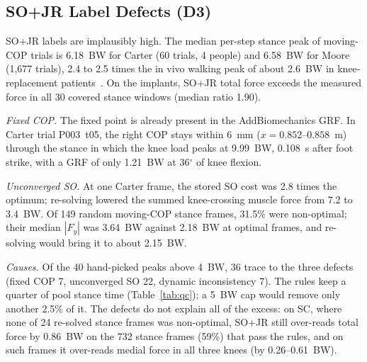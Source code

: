 \subsection{SO+JR Label Defects (D3)}\label{sec:res-d3}
SO+JR labels are implausibly high. The median per-step stance peak of moving-COP trials is
6.18~BW for Carter (60 trials, 4 people) and 6.58~BW for Moore (1,677 trials), 2.4 to 2.5 times
the in vivo walking peak of about 2.6~BW in knee-replacement patients~\cite{kutzner2010}. On the
implants, SO+JR total force exceeds the measured force in all 30 covered stance windows (median
ratio 1.90).

\textit{Fixed COP.} The fixed point is already present in the AddBiomechanics GRF. In Carter trial
P003~t05, the right COP stays within 6~mm ($x = 0.852$--$0.858$~m) through the stance in which the
knee load peaks at 9.99~BW, 0.108~s after foot strike, with a GRF of only 1.21~BW at 36$^\circ$ of
knee flexion.

\textit{Unconverged SO.} At one Carter frame, the stored SO cost was 2.8 times the optimum;
re-solving lowered the summed knee-crossing muscle force from 7.2 to 3.4~BW. Of
149 random moving-COP stance frames, 31.5\% were non-optimal; their median $|F_y|$
was 3.64~BW against 2.18~BW at optimal frames, and re-solving would bring it to about 2.15~BW.

\textit{Causes.} Of the 40 hand-picked peaks above 4~BW, 36 trace to the three defects (fixed COP
7, unconverged SO 22, dynamic inconsistency 7). The rules keep a quarter of pool stance time
(Table~\ref{tab:qc}); a 5~BW cap would remove only another 2.5\% of it. The defects do not explain
all of the excess: on SC, where none of 24 re-solved stance frames was non-optimal, SO+JR still
over-reads total force by 0.86~BW on the 732 stance frames (59\%) that pass the rules, and on such
frames it over-reads medial force in all three knees (by 0.26--0.61~BW).

